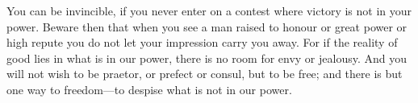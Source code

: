 You can be invincible, if you never enter  on a contest where victory is not in
your power. Beware then that when you see a man raised to honour or great power
or  high repute  you do  not let  your impression  carry you  away. For  if the
reality of  good lies in  what is in  our power, there is  no room for  envy or
jealousy. And you will not wish to be  praetor, or prefect or consul, but to be
free; and  there is  but one  way to freedom---to  despise what  is not  in our
power.
